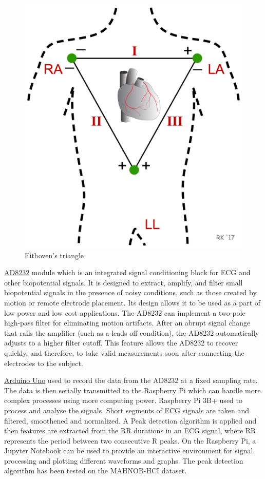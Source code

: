 \documentclass[11pt]{article}
\theoremstyle{definition}
\begin{document}
  \begin{figure}
    \centering
    \includegraphics[scale=0.1]{images/eithoven_triangle.png}
    \caption{Eithoven's triangle\cite{cvp:ECG_eithoven}}
    \label{fig:eithoven_triangle}
  \end{figure}

  \underline{AD8232}\cite{ae:ad8232} module which is an integrated signal conditioning block for ECG and other biopotential signals.
  It is designed to extract, amplify, and filter small biopotential signals in the presence of noisy conditions, such as those created by motion or remote electrode placement.
  Its design allows it to be used as a part of low power and low cost applications.
  The AD8232 can implement a two-pole high-pass filter for eliminating motion artifacts.
  After an abrupt signal change that rails the amplifier (such as a leads off condition), the AD8232 automatically adjusts to a higher filter cutoff.
  This feature allows the AD8232 to recover quickly, and therefore, to take valid measurements soon after connecting the electrodes to the subject.


  \underline{Arduino Uno} used to record the data from the AD8232 at a fixed sampling rate.
  The data is then serially transmitted to the Raspberry Pi which can handle more complex processes using more computing power.
  Raspberry Pi 3B+ used to process and analyse the signals.
  Short segments of ECG signals are taken and filtered, smoothened and normalized.
  A Peak detection algorithm is applied and then features are extracted from the RR durations in an ECG signal, where RR represents the period between two consecutive R peaks.
  On the Raspberry Pi, a Jupyter Notebook can be used to provide an interactive environment for signal processing and plotting different waveforms and graphs.
  The peak detection algorithm has been tested on the MAHNOB-HCI\cite{lichtenauer2011mahnob} dataset.
  
\end{document}
